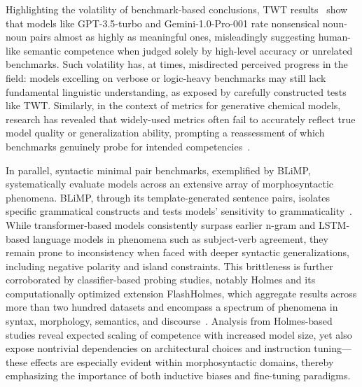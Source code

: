 \documentclass[sigconf]{acmart}
\begin{document}
Highlighting the volatility of benchmark-based conclusions, TWT results~\cite{ref96} show that models like GPT-3.5-turbo and Gemini-1.0-Pro-001 rate nonsensical noun-noun pairs almost as highly as meaningful ones, misleadingly suggesting human-like semantic competence when judged solely by high-level accuracy or unrelated benchmarks. Such volatility has, at times, misdirected perceived progress in the field: models excelling on verbose or logic-heavy benchmarks may still lack fundamental linguistic understanding, as exposed by carefully constructed tests like TWT. Similarly, in the context of metrics for generative chemical models, research has revealed that widely-used metrics often fail to accurately reflect true model quality or generalization ability, prompting a reassessment of which benchmarks genuinely probe for intended competencies~\cite{ref91}.

In parallel, syntactic minimal pair benchmarks, exemplified by BLiMP, systematically evaluate models across an extensive array of morphosyntactic phenomena. BLiMP, through its template-generated sentence pairs, isolates specific grammatical constructs and tests models' sensitivity to grammaticality~\cite{ref97,ref99}. While transformer-based models consistently surpass earlier n-gram and LSTM-based language models in phenomena such as subject-verb agreement, they remain prone to inconsistency when faced with deeper syntactic generalizations, including negative polarity and island constraints. This brittleness is further corroborated by classifier-based probing studies, notably Holmes and its computationally optimized extension FlashHolmes, which aggregate results across more than two hundred datasets and encompass a spectrum of phenomena in syntax, morphology, semantics, and discourse~\cite{ref97,ref105}. Analysis from Holmes-based studies reveal expected scaling of competence with increased model size, yet also expose nontrivial dependencies on architectural choices and instruction tuning---these effects are especially evident within morphosyntactic domains, thereby emphasizing the importance of both inductive biases and fine-tuning paradigms.
\end{document}
